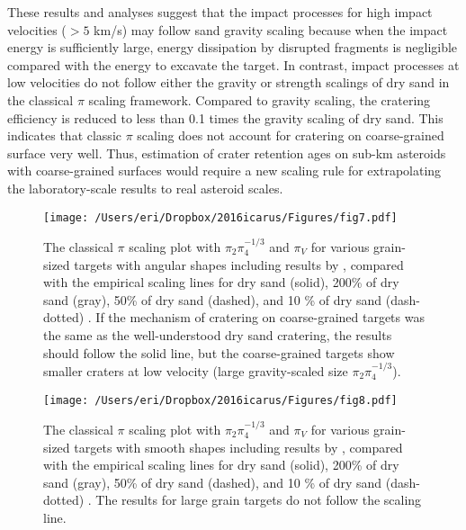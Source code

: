 \documentclass[3p,authoryear]{elsarticle}
\begin{document}
These results and analyses suggest that the impact processes for high impact velocities ($> 5$ km/s) may follow sand gravity scaling because when the impact energy is sufficiently large, energy dissipation by disrupted fragments is negligible compared with the energy to excavate the target. In contrast, impact processes at low velocities do not follow either the gravity or strength scalings of dry sand in the classical $\pi$ scaling framework. Compared to gravity scaling, the cratering efficiency is reduced to less than 0.1 times the gravity scaling of dry sand. This indicates that classic $\pi$ scaling does not account for cratering on coarse-grained surface very well. Thus, estimation of crater retention ages on sub-km asteroids with coarse-grained surfaces would require a new scaling rule for extrapolating the laboratory-scale results to real asteroid scales.
%
\begin{figure}[htbp]
	\begin{center}
	\texttt{[image: /Users/eri/Dropbox/2016icarus/Figures/fig7.pdf]}
	\caption{The classical $\pi$ scaling plot with $\pi_2\pi_4^{-1/3}$ and $\pi_V$ for various grain-sized targets with angular shapes including results by \citet{schmidt1980,mizutani1983,cintala1999}, compared with the empirical scaling lines for dry sand (solid), 200\% of dry sand (gray), 50\% of dry sand (dashed), and 10 \% of dry sand (dash-dotted) \citep{schmidt1987}. If the mechanism of cratering on coarse-grained targets was the same as the well-understood dry sand cratering, the results should follow the solid line, but the coarse-grained targets show smaller craters at low velocity (large gravity-scaled size $\pi_2\pi_4^{-1/3}$).}
	\label{pi2-pebble}
	\end{center}
\end{figure}

\begin{figure}[htbp]
	\begin{center}
	\texttt{[image: /Users/eri/Dropbox/2016icarus/Figures/fig8.pdf]}
	\caption{The classical $\pi$ scaling plot with $\pi_2\pi_4^{-1/3}$ and $\pi_V$ for various grain-sized targets with smooth shapes including results by \citet{schmidt1980,yamamoto2006,guettler2012}, compared with the empirical scaling lines for dry sand (solid), 200\% of dry sand (gray), 50\% of dry sand (dashed), and 10 \% of dry sand (dash-dotted) \citep{schmidt1987}. The results for large grain targets do not follow the scaling line.}
	\label{pi2-gb}
	\end{center}
\end{figure}
\end{document}
